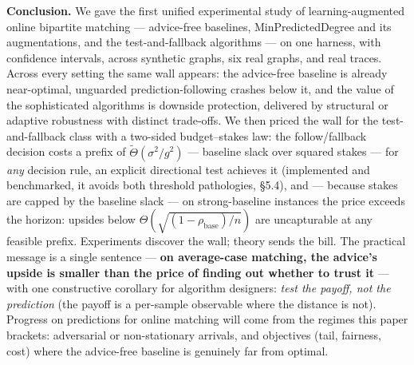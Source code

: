 \textbf{Conclusion.} We gave the first unified experimental study of
learning-augmented online bipartite matching --- advice-free baselines,
MinPredictedDegree and its augmentations, and the test-and-fallback
algorithms --- on one harness, with confidence intervals, across
synthetic graphs, six real graphs, and real traces. Across every setting
the same wall appears: the advice-free baseline is already near-optimal,
unguarded prediction-following crashes below it, and the value of the
sophisticated algorithms is downside protection, delivered by structural
or adaptive robustness with distinct trade-offs. We then priced the wall
for the test-and-fallback class with a two-sided budget--stakes law: the
follow/fallback decision costs a prefix of
\(\tilde\Theta(\sigma^2/g^2)\) --- baseline slack over squared stakes
--- for \emph{any} decision rule, an explicit directional test achieves
it (implemented and benchmarked, it avoids both threshold pathologies,
§5.4), and --- because stakes are capped by the baseline slack --- on
strong-baseline instances the price exceeds the horizon: upsides below
\(\Theta(\sqrt{(1-\rho_{\mathrm{base}})/n})\) are uncapturable at any
feasible prefix. Experiments discover the wall; theory sends the bill.
The practical message is a single sentence --- \textbf{on average-case
matching, the advice's upside is smaller than the price of finding out
whether to trust it} --- with one constructive corollary for algorithm
designers: \emph{test the payoff, not the prediction} (the payoff is a
per-sample observable where the distance is not). Progress on
predictions for online matching will come from the regimes this paper
brackets: adversarial or non-stationary arrivals, and objectives (tail,
fairness, cost) where the advice-free baseline is genuinely far from
optimal.
